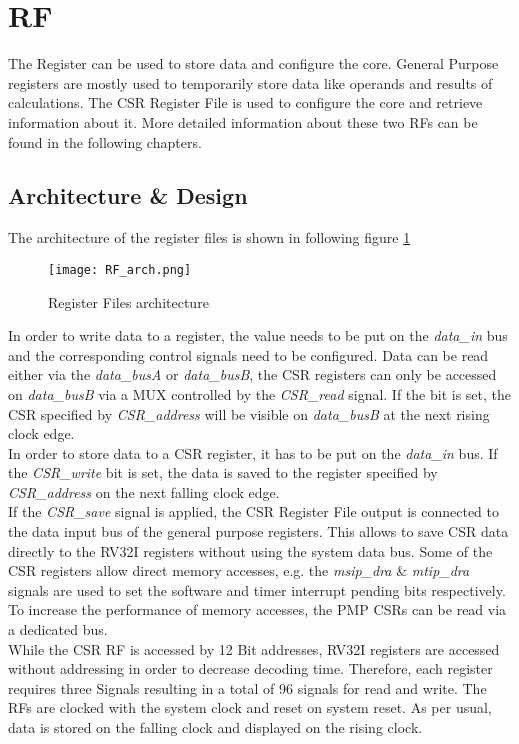 \section{\acf{RF}}
The Register can be used to store data and configure the core. General Purpose
registers are mostly used to temporarily store data like operands and results of
calculations. The CSR Register File is used to configure the core and retrieve
information about it. More detailed information about these two RFs can be found in
the following chapters.
\clearpage
\subsection{Architecture \& Design}
The architecture of the register files is shown in following figure \ref{fig:RF_arch}

\begin{figure}[H]
	\centering
	\texttt{[image: RF\_arch.png]}
	\caption{Register Files architecture}
	\label{fig:RF_arch}
\end{figure}

In order to write data to a register, the value needs to be put on the \textit{data\_in} bus and the corresponding control signals need to be configured. Data can be read either via the \textit{data\_busA} or \textit{data\_busB}, the CSR registers can only be accessed on \textit{data\_busB} via a MUX controlled by the \textit{CSR\_read} signal. If the bit is set, the CSR specified by \textit{CSR\_address} will be visible on \textit{data\_busB} at the next rising clock edge.\\
In order to store data to a CSR register, it has to be put on the \textit{data\_in} bus. If the \textit{CSR\_write} bit is set, the data is saved to the register specified by \textit{CSR\_address} on the next falling clock edge.\\
If the \textit{CSR\_save} signal is applied, the CSR Register File output is connected to the data input bus of the general purpose registers. This allows to save CSR data directly to the RV32I registers without using the system data bus. Some of the CSR registers allow direct memory accesses, e.g. the \textit{msip\_dra} \& \textit{mtip\_dra} signals are used to set the software and timer interrupt pending bits respectively. To increase the performance of memory accesses, the PMP CSRs can be read via a dedicated bus.\\
While the CSR RF is accessed by 12 Bit addresses, RV32I registers are accessed without addressing in order to decrease decoding time. Therefore, each register requires three Signals resulting in a total of 96 signals for read and write. The RFs are clocked with the system clock and reset on system reset. As per usual, data is stored on the falling clock and displayed on the rising clock.

